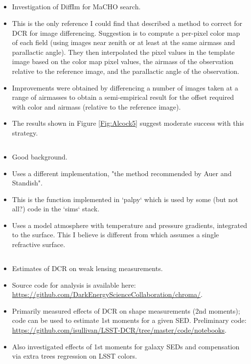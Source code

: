 \documentclass[]{article}
\begin{document}
\subsection{\cite{AlcockDiffIm1999}}
\begin{itemize}
	\item Investigation of DiffIm for MaCHO search.
	\item This is the only reference I could find that described a method
	to correct for DCR for image differencing. Suggestion is to compute a
	per-pixel color map of each field (using images near zenith or at
	least at the same airmass and parallactic angle). They then
	interpolated the pixel values in the template image based on the
	color map pixel values, the airmass of the observation relative to
	the reference image, and the parallactic angle of the observation.
	\item Improvements were obtained by differencing a number of images
	taken at a range of airmasses to obtain a semi-empirical result for
	the offset required with color and airmass (relative to the
	reference image).
	\item The results shown in Figure \ref{Fig:Alcock5} suggest moderate success with this
	strategy.
\end{itemize}

\subsection{\cite{Hohenkerk1985}}
\begin{itemize}
	\item Good background.
	\item Uses a different implementation, "the method recommended by Auer
	and Standish".
	\item This is the function implemented in `palpy` which is used by
	some (but not all?) code in the `sims` stack.
	\item Uses a model atmosphere with temperature and pressure gradients,
	integrated to the surface.  This I believe is different from \cite{Filippenko1982}
	which assumes a single refractive surface.
\end{itemize}

\subsection{\cite{Meyers2015}}

\begin{itemize}
	\item Estimates of DCR on weak lensing measurements.
	\item Source code for analysis is available here:
          \url{https://github.com/DarkEnergyScienceCollaboration/chroma/}.
	\item Primarily measured effects of DCR on shape measurements
          (2nd moments); code can be used to estimate 1st moments for
          a given SED. Preliminary code:
          \url{https://github.com/isullivan/LSST-DCR/tree/master/code/notebooks}.
        \item Also investigated effects of 1st moments for galaxy SEDs
          and compensation via extra trees regression on LSST colors.
\end{itemize}
\end{document}
